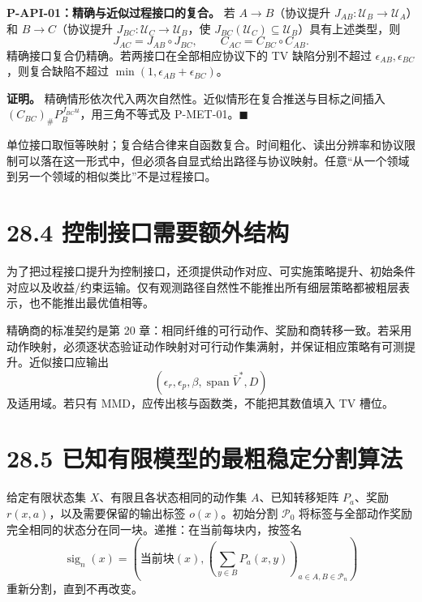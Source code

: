 \documentclass[
  11pt,
  oneside]{book}
\begin{document}
\hypertarget{p-api-01}{}\label{p-api-01}

\textbf{P-API-01：精确与近似过程接口的复合。} 若 \(A\to B\)（协议提升 \(J_{AB}:\mathcal U_B\to\mathcal U_A\)）和 \(B\to C\)（协议提升 \(J_{BC}:\mathcal U_C\to\mathcal U_B\)，使 \(J_{BC}(\mathcal U_C)\subseteq\mathcal U_B\)）具有上述类型，则 \[J_{AC}=J_{AB}\circ J_{BC},\qquad
C_{AC}=C_{BC}\circ C_{AB}.\] 精确接口复合仍精确。若两接口在全部相应协议下的 TV 缺陷分别不超过 \(\epsilon_{AB},\epsilon_{BC}\)，则复合缺陷不超过 \(\min(1,\epsilon_{AB}+\epsilon_{BC})\)。

\textbf{证明。} 精确情形依次代入两次自然性。近似情形在复合推送与目标之间插入 \((C_{BC})_\#P_B^{J_{BC}u}\)，用三角不等式及 P-MET-01。\(\blacksquare\)

单位接口取恒等映射；复合结合律来自函数复合。时间粗化、读出分辨率和协议限制可以落在这一形式中，但必须各自显式给出路径与协议映射。任意``从一个领域到另一个领域的相似类比''不是过程接口。

\section{28.4 控制接口需要额外结构}\label{ux63a7ux5236ux63a5ux53e3ux9700ux8981ux989dux5916ux7ed3ux6784}

为了把过程接口提升为控制接口，还须提供动作对应、可实施策略提升、初始条件对应以及收益/约束运输。仅有观测路径自然性不能推出所有细层策略都被粗层表示，也不能推出最优值相等。

精确商的标准契约是第 20 章：相同纤维的可行动作、奖励和商转移一致。若采用动作映射，必须逐状态验证动作映射对可行动作集满射，并保证相应策略有可测提升。近似接口应输出 \[(\epsilon_r,\epsilon_p,\beta,\operatorname{span}\bar V^*,D)\] 及适用域。若只有 MMD，应传出核与函数类，不能把其数值填入 TV 槽位。

\section{28.5 已知有限模型的最粗稳定分割算法}\label{ux5df2ux77e5ux6709ux9650ux6a21ux578bux7684ux6700ux7c97ux7a33ux5b9aux5206ux5272ux7b97ux6cd5}

给定有限状态集 \(X\)、有限且各状态相同的动作集 \(A\)、已知转移矩阵 \(P_a\)、奖励 \(r(x,a)\)，以及需要保留的输出标签 \(o(x)\)。初始分割 \(\mathcal P_0\) 将标签与全部动作奖励完全相同的状态分在同一块。递推：在当前每块内，按签名 \[\operatorname{sig}_n(x)
=\left(\text{当前块}(x),
\left(\sum_{y\in B}P_a(x,y)\right)_{a\in A,B\in\mathcal P_n}\right)\] 重新分割，直到不再改变。
\end{document}
